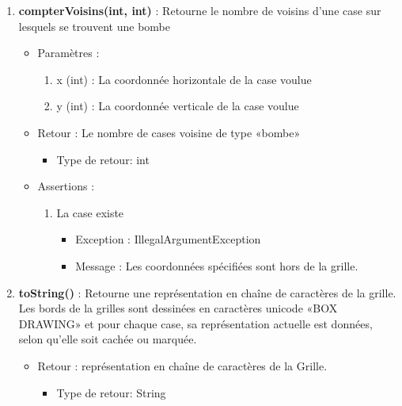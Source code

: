 \begin{itemize}
\begin{enumerate}
    \item {\bf compterVoisins(int, int) }: Retourne le nombre de voisins d'une case sur lesquels se trouvent une bombe
      \begin{itemize}
      \item Paramètres : 
        \begin{enumerate}
        \item x (int) : La coordonnée horizontale de la case voulue
        \item y (int) : La coordonnée verticale de la case voulue          
        \end{enumerate}
      \item Retour : Le nombre de cases voisine de type «bombe»
          \begin{itemize}
          \item Type de retour: int
          \end{itemize}
      \item Assertions : 
        \begin{enumerate}
        \item La case existe
          \begin{itemize}
            \item Exception : IllegalArgumentException
          \item Message : Les coordonnées spécifiées sont hors de la grille.
          \end{itemize}
        \end{enumerate}
      \end{itemize}
      
    \item {\bf toString() }: Retourne une représentation en chaîne de caractères de la grille. Les bords de la grilles sont dessinées en caractères unicode «BOX DRAWING» et pour chaque case, sa représentation actuelle est données, selon qu'elle soit cachée ou marquée.
      \begin{itemize}
      \item Retour : représentation en chaîne de caractères de la Grille.
          \begin{itemize}
          \item Type de retour: String
          \end{itemize}
      \end{itemize}
      

\end{enumerate}
\end{itemize}
